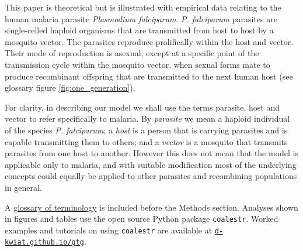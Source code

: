 \documentclass[_main.tex]{subfiles}
\begin{document}
This paper is theoretical but is illustrated with empirical data relating to the human malaria parasite \textit{Plasmodium falciparum}.  \textit{P. falciparum} parasites are single-celled haploid organisms that are transmitted from host to host by a mosquito vector.  The parasites reproduce prolifically within the host and vector.  Their mode of reproduction is asexual, except at a specific point of the transmission cycle within the mosquito vector, when sexual forms mate to produce recombinant offspring that are transmitted to the next human host (see glossary figure \ref{fig:one_generation}).

For clarity, in describing our model we shall use the terms parasite, host and vector to refer specifically to malaria.  By \textit{parasite} we mean a haploid individual of the species \textit{P. falciparum}; a \textit{host} is a person that is carrying parasites and is capable transmitting them to others; and a \textit{vector} is a mosquito that transmits parasites from one host to another.  However this does not mean that the model is applicable only to malaria, and with suitable modification most of the underlying concepts could equally be applied to other parasites and recombining populations in general. 

A \hyperref[supp_glossary]{glossary of terminology} is included before the Methods section.  Analyses shown in figures and tables use the open source Python package \texttt{coalestr}.  Worked examples and tutorials on using \texttt{coalestr} are available at \href{https://d-kwiat.github.io/gtg}{\texttt{d-kwiat.github.io/gtg}}. 
\end{document}
